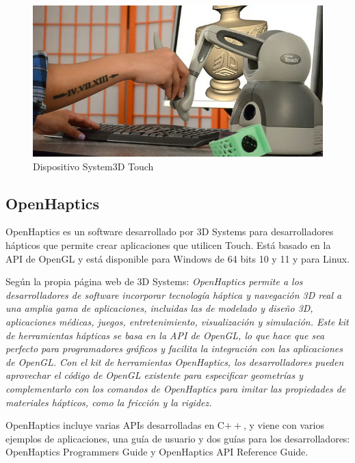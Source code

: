 \documentclass[a4paper,11pt, oneside]{book}
\begin{document}
\begin{figure}[H]
	
	\centering
	\includegraphics[width=\linewidth]{touch}
	\caption{Dispositivo System3D Touch}
	\label{fig:figura1}
	
\end{figure}

\subsection{OpenHaptics}

OpenHaptics\cite{OpenHaptics} es un software desarrollado por 3D Systems para desarrolladores hápticos que permite crear aplicaciones que utilicen Touch. Está basado en la API de OpenGL\cite{opengl} y está disponible para Windows de 64 bits 10 y 11 y para Linux. 

Según la propia página web de 3D Systems: \textit{OpenHaptics permite a los desarrolladores de software incorporar tecnología háptica y navegación 3D real a una amplia gama de aplicaciones, incluidas las de modelado y diseño 3D, aplicaciones médicas, juegos, entretenimiento, visualización y simulación. Este kit de herramientas hápticas se basa en la API de OpenGL, lo que hace que sea perfecto para programadores gráficos y facilita la integración con las aplicaciones de OpenGL. Con el kit de herramientas OpenHaptics, los desarrolladores pueden aprovechar el código de OpenGL existente para especificar geometrías y complementarlo con los comandos de OpenHaptics para imitar las propiedades de materiales hápticos, como la fricción y la rigidez.}

OpenHaptics incluye varias APIs desarrolladas en C$++$, y viene con varios ejemplos de aplicaciones, una guía de usuario y dos guías para los desarrolladores: OpenHaptics Programmers Guide y OpenHaptics API Reference Guide. 
\end{document}
